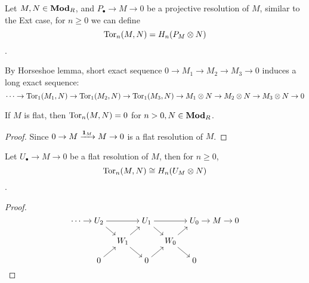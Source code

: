 \begin{definition}
  Let $M, N \in \mathbf{Mod}_R$, and $P_\bullet \to M \to 0$ be a projective resolution of $M$, 
  similar to the Ext case, for $n \ge 0$ we can define
  $$\operatorname{Tor}_n(M, N) = H_n(P_M \otimes N)$$.
\end{definition}

\begin{fact}
  By Horseshoe lemma, short exact sequence $0 \to M_1 \to M_2 \to M_3 \to 0$
  induces a long exact sequence:
  $$\cdots \to \operatorname{Tor}_1(M_1, N) \to \operatorname{Tor}_1(M_2, N) \to \operatorname{Tor}_1(M_3, N) \to 
  M_1 \otimes N \to M_2 \otimes N \to M_3 \otimes N \to 0$$
\end{fact}

\begin{prop}
  If $M$ is flat, then $\operatorname{Tor}_n(M, N) = 0$ for $n > 0, N \in \mathbf{Mod}_R$.
  \begin{proof}
    Since $0 \to M \xrightarrow{\mathbf{1}_M} M \to 0$ is a flat resolution of $M$. 
  \end{proof}
\end{prop}

\begin{theorem}
  Let $U_\bullet \to M \to 0$ be a flat resolution of $M$, then for $n \ge 0$,
  $$\operatorname{Tor}_n(M, N) \cong H_n(U_M \otimes N)$$.
  \begin{proof}
    $$
      \begin{tikzcd}[cramped, sep=10pt]
        \cdots \ar[r] & U_2 \ar[rr] \ar[rd] && U_1 \ar[rr] \ar[rd] && U_0 \ar[r] & M \ar[r] & 0 \\
                      && W_1 \ar[ru] \ar[rd] && W_0 \ar[ru] \ar[rd] \\
                      & 0 \ar[ru] && 0 \ar[ru] && 0
      \end{tikzcd}
    $$
  \end{proof}
\end{theorem}
